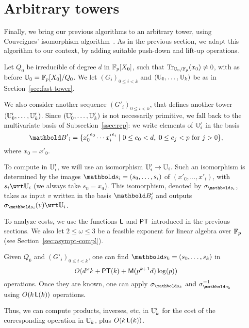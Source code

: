 

\section{Arbitrary towers}
\label{sec:couveignes-algorithm}

 Finally, we bring our
previous algorithms to an arbitrary tower, using Couveignes'
isomorphism algorithm~\cite{couveignes00}. As in the previous section,
we adapt this algorithm to our context, by adding suitable push-down
and lift-up operations.

Let $Q_0$ be irreducible of degree $d$ in $\mathbb{F}_p[X_0]$, such that
$\operatorname{Tr}_{\mathbb{U}_0/\mathbb{F}_p}(x_0)\ne0$, with as before
$\mathbb{U}_0=\mathbb{F}_p[X_0]/Q_0$. We let $(G_i)_{0 \le i < k}$ and
$(\mathbb{U}_0,\ldots,\mathbb{U}_k)$ be as in Section~\ref{sec:fast-tower}.

We also consider another sequence $(G'_i)_{0 \le i < k}$, that defines
another tower $(\mathbb{U}'_0,\ldots,\allowbreak\mathbb{U}'_k)$.  Since $(\mathbb{U}'_0,\ldots,\mathbb{U}'_k)$ is
not necessarily primitive, we fall back to the multivariate basis of
Subsection~\ref{ssec:rep}: we write elements of $\mathbb{U}'_i$ in the basis
  \begin{equation}
  \basis{B'}_i=
  \{{x'_0}^{e_0} \cdots {x'_i}^{e_i} \;|\; 0 \le e_0 < d,\; 0\le e_j < p 
  \text{ for $j>0$}\}
  \text{,}
\end{equation}
where $x_0=x'_0$.

To compute in $\mathbb{U}'_i$, we will use an isomorphism $\mathbb{U}'_i \rightarrow \mathbb{U}_i$.
Such an isomorphism is determined by the images
$\lst{s}_i=(s_0,\dots,s_i)$ of $(x'_0,\dots,x'_i)$, with $s_i \wrt
\U_i$ (we always take $s_0=x_0$). This isomorphism, denoted by
$\sigma_{\lst{s}_i}$, takes as input $v$ written in the basis
$\basis{B}'_i$ and outputs $\sigma_{\lst{s}_i}(v)\wrt \U_i$.

To analyze costs, we use the functions $\mathsf{L}$ and $\mathsf{PT}$ introduced
in the previous sections. We also let $2 \le \omega \le 3$ be a
feasible exponent for linear algebra over $\mathbb{F}_p$ (see
Section~\ref{sec:asympt-compl}).
\begin{theorem}\label{theo:main}
  Given $Q_0$ and $(G'_i)_{0 \le i < k}$, one can find
  $\lst{s}_k=(s_0,\dots,s_k)$ in 
  \begin{equation}
    \label{eq:105}
    O(d^\omega k + \mathsf{PT}(k) +
    \mathsf{M}(p^{k+1} d) \log(p))
  \end{equation}
  operations. Once they are known, one can apply $\sigma_{\lst{s}_k}$
  and $\sigma_{\lst{s}_k}^{-1}$ using $O(k\, \mathsf{L}(k))$ operations.
\end{theorem}
Thus, we can compute products, inverses, etc, in $\mathbb{U}'_k$ for
the cost of the corresponding operation in $\mathbb{U}_k$, plus $O(k\,
\mathsf{L}(k))$.

